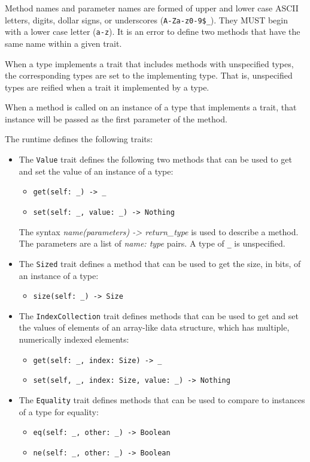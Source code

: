 \documentclass[10pt,twocolumn,a4paper]{article}
\newcommand{\code}[1]{\texttt{#1}}
\begin{document}
Method names and parameter names are formed of upper and lower case ASCII
letters, digits, dollar signs, or underscores (\code{A-Za-z0-9\$\_}). They
MUST begin with a lower case letter (\code{a-z}).
It is an error to define two methods that have the same name within a given
trait.

When a type implements a trait that includes methods with unspecified
types, the corresponding types are set to the implementing type. That is,
unspecified types are reified when a trait it implemented by a type.

When a method is called on an instance of a type that implements a trait,
that instance will be passed as the first parameter of the method.

The runtime defines the following traits:
\begin{itemize}
  \item The \code{Value} trait defines the following two methods that can
    be used to get and set the value of an instance of a type:
    \begin{itemize}
      \item \texttt{get(self: \_) -> \_}
      \item \texttt{set(self: \_, value: \_) -> Nothing}
    \end{itemize}
    The syntax \emph{name(parameters) -> return\_type} is used to
    describe a method. The parameters are a  list of \emph{name: type}
    pairs. A type of \texttt{\_} is unspecified.

  \item The \code{Sized} trait defines a method that can be used to get the
    size, in bits, of an instance of a type:
    \begin{itemize}
      \item \texttt{size(self: \_) -> Size}
    \end{itemize}

  \item The \code{IndexCollection} trait defines methods that can be used
    to get and set the values of elements of an array-like data structure,
    which has multiple, numerically indexed elements:
    \begin{itemize}
      \item \texttt{get(self: \_, index: Size) -> \_}
      \item \texttt{set(self, \_, index: Size, value: \_) -> Nothing}
    \end{itemize}

  \item The \code{Equality} trait defines methods that can be used to
    compare to instances of a type for equality:
    \begin{itemize}
      \item \texttt{eq(self: \_, other: \_) -> Boolean}
      \item \texttt{ne(self: \_, other: \_) -> Boolean}
    \end{itemize}


\end{itemize}
\end{document}
